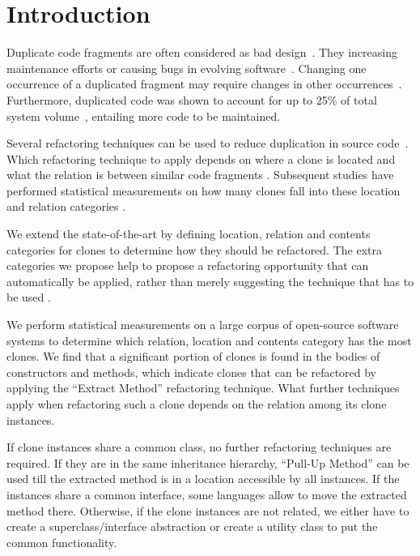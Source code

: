 \documentclass[runningheads]{llncs}
\begin{document}
\section{Introduction}
Duplicate code fragments are often considered as bad design~\cite{fowler2018refactoring}. They increasing maintenance efforts or causing bugs in evolving software~\cite{heitlager2007practical}. Changing one occurrence of a duplicated fragment may require changes in other occurrences~\cite{ostberg2014automatically}. Furthermore, duplicated code was shown to account for up to 25\% of total system volume~\cite{bruntink2005use}, entailing more code to be maintained.

Several refactoring techniques can be used to reduce duplication in source code~\cite{fowler2018refactoring}. Which refactoring technique to apply depends on where a clone is located and what the relation is between similar code fragments \cite{koni2001scenario}. Subsequent studies have performed statistical measurements on how many clones fall into these location and relation categories \cite{fontana2012duplicated, fontana2015duplicated}.

We extend the state-of-the-art \cite{fontana2015duplicated} by defining location, relation and contents categories for clones to determine how they should be refactored. The extra categories we propose help to propose a refactoring opportunity that can automatically be applied, rather than merely suggesting the technique that has to be used \cite{fontana2015duplicated}.

We perform statistical measurements on a large corpus of open-source software systems to determine which relation, location and contents category has the most clones. We find that a significant portion of clones is found in the bodies of constructors and methods, which indicate clones that can be refactored by applying the ``Extract Method'' refactoring technique. What further techniques apply when refactoring such a clone depends on the relation among its clone instances.

If clone instances share a common class, no further refactoring techniques are required. If they are in the same inheritance hierarchy, ``Pull-Up Method'' can be used till the extracted method is in a location accessible by all instances. If the instances share a common interface, some languages allow to move the extracted method there. Otherwise, if the clone instances are not related, we either have to create a superclass/interface abstraction or create a utility class to put the common functionality.
\end{document}
